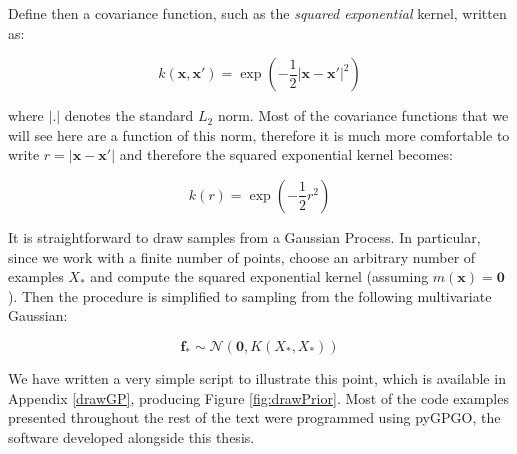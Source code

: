 \documentclass[10pt,a4paper,twoside]{book}
\begin{document}
%

Define then a covariance function, such as the \textit{squared exponential} kernel, written as:

\begin{equation}
k(\boldsymbol{x}, \boldsymbol{x}') = \exp\left(-\dfrac{1}{2}|\boldsymbol{x} - \boldsymbol{x}'|^2\right)
\end{equation}

where $|.|$ denotes the standard $L_2$ norm. Most of the covariance functions that we will see here are a function of this norm, therefore it is much more comfortable to write $r = |\boldsymbol{x} - \boldsymbol{x}'|$ and therefore the squared exponential kernel becomes:

\begin{equation}
\label{sqexp}
k(r) = \exp\left(-\dfrac{1}{2}r^2\right)
\end{equation}

It is straightforward to draw samples from a Gaussian Process. In particular, since we work with a finite number of points, choose an arbitrary number of examples $X_*$ and compute the squared exponential kernel (assuming $m(\boldsymbol{x})=\boldsymbol{0}$). Then the procedure is simplified to sampling from the following multivariate Gaussian:

\begin{equation}
\label{fprior}
\boldsymbol{f_*} \sim \mathcal{N}\left(\boldsymbol{0}, K(X_*, X_*)\right)
\end{equation}


We have written a very simple script to illustrate this point, which is available in Appendix \ref{drawGP}, producing Figure \ref{fig:drawPrior}. Most of the code examples presented throughout the rest of the text were programmed using pyGPGO, the software developed alongside this thesis.\\
\end{document}
